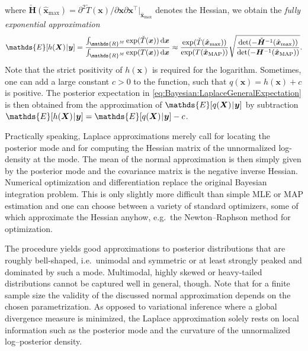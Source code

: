 where \(\check{\bm{H}}(\hat{\bm{x}}_{\mathrm{max}}) = \partial^2 \check{T}(\bm{x}) / \partial \bm{x} \partial \bm{x}^\top \vert_{\hat{\bm{x}}_{\mathrm{max}}}\) denotes the Hessian,
we obtain the \emph{fully exponential approximation}
\begin{equation} \label{eq:Bayesian:LaplaceGeneralExpectation}
  \mathds{E}[h(\bm{X}) \cond \bm{y}]
  = \frac{\int_{\mathds{R}^\dimParam} \exp(\check{T}(\bm{x})) \, \mathrm{d} \bm{x}}{\int_{\mathds{R}^\dimParam} \exp(T(\bm{x})) \, \mathrm{d} \bm{x}}
  \approx \frac{\exp(\check{T}(\hat{\bm{x}}_{\mathrm{max}}))}{\exp(T(\hat{\bm{x}}_{\mathrm{MAP}}))}
  \sqrt{\frac{\det(-\check{\bm{H}}^{-1}(\hat{\bm{x}}_{\mathrm{max}}))}{\det(-\bm{H}^{-1}(\hat{\bm{x}}_{\mathrm{MAP}}))}}.
\end{equation}
Note that the strict positivity of \(h(\bm{x})\) is required for the logarithm.
Sometimes, one can add a large constant \(c > 0\) to the function, such that \(q(\bm{x}) = h(\bm{x}) + c\) is positive.
The posterior expectation in \cref{eq:Bayesian:LaplaceGeneralExpectation} is then obtained
from the approximation of \(\mathds{E}[q(\bm{X}) \cond \bm{y}]\) by subtraction \(\mathds{E}[h(\bm{X}) \cond \bm{y}] = \mathds{E}[q(\bm{X}) \cond \bm{y}] - c\).
\par %
Practically speaking, Laplace approximations merely call for locating the posterior mode and for computing the Hessian matrix of the unnormalized log-density at the mode.
The mean of the normal approximation is then simply given by the posterior mode and the covariance matrix is the negative inverse Hessian.
Numerical optimization and differentiation replace the original Bayesian integration problem.
This is only slightly more difficult than simple MLE or MAP estimation and one can choose between a variety of standard optimizers,
some of which approximate the Hessian anyhow, e.g.\ the Newton--Raphson method for optimization.
\par %
The procedure yields good approximations to posterior distributions that are roughly bell-shaped, i.e.\ unimodal and symmetric or at least strongly peaked and dominated by such a mode.
Multimodal, highly skewed or heavy-tailed distributions cannot be captured well in general, though.
Note that for a finite sample size the validity of the discussed normal approximation depends on the chosen parametrization.
As opposed to variational inference where a global divergence measure is minimized,
the Laplace approximation solely rests on local information such as the posterior mode and the curvature of the unnormalized log--posterior density.
